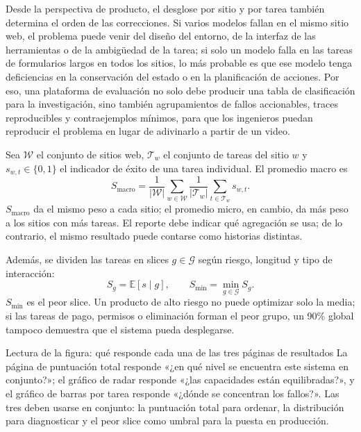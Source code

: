 


Desde la perspectiva de producto, el desglose por sitio y por tarea también determina el orden de las correcciones. Si varios modelos fallan en el mismo sitio web, el problema puede venir del diseño del entorno, de la interfaz de las herramientas o de la ambigüedad de la tarea; si solo un modelo falla en las tareas de formularios largos en todos los sitios, lo más probable es que ese modelo tenga deficiencias en la conservación del estado o en la planificación de acciones. Por eso, una plataforma de evaluación no solo debe producir una tabla de clasificación para la investigación, sino también agrupamientos de fallos accionables, traces reproducibles y contraejemplos mínimos, para que los ingenieros puedan reproducir el problema en lugar de adivinarlo a partir de un video.

Sea $\mathcal{W}$ el conjunto de sitios web, $\mathcal{T}_w$ el conjunto de tareas del sitio $w$ y $s_{w,t}\in\{0,1\}$ el indicador de éxito de una tarea individual. El promedio macro es
\[
S_{\text{macro}}=\frac{1}{|\mathcal{W}|}\sum_{w\in\mathcal{W}}
\frac{1}{|\mathcal{T}_w|}\sum_{t\in\mathcal{T}_w}s_{w,t}.
\]
$S_{\text{macro}}$ da el mismo peso a cada sitio; el promedio micro, en cambio, da más peso a los sitios con más tareas. El reporte debe indicar qué agregación se usa; de lo contrario, el mismo resultado puede contarse como historias distintas.

Además, se dividen las tareas en slices $g\in\mathcal{G}$ según riesgo, longitud y tipo de interacción:
\[
S_g=\mathbb{E}[s\mid g],\qquad
S_{\min}=\min_{g\in\mathcal{G}}S_g.
\]
$S_{\min}$ es el peor slice. Un producto de alto riesgo no puede optimizar solo la media; si las tareas de pago, permisos o eliminación forman el peor grupo, un 90\% global tampoco demuestra que el sistema pueda desplegarse.

\begin{knowledgebox}{Lectura de la figura: qué responde cada una de las tres páginas de resultados}
La página de puntuación total responde «¿en qué nivel se encuentra este sistema en conjunto?»; el gráfico de radar responde «¿las capacidades están equilibradas?», y el gráfico de barras por tarea responde «¿dónde se concentran los fallos?». Las tres deben usarse en conjunto: la puntuación total para ordenar, la distribución para diagnosticar y el peor slice como umbral para la puesta en producción.
\end{knowledgebox}

